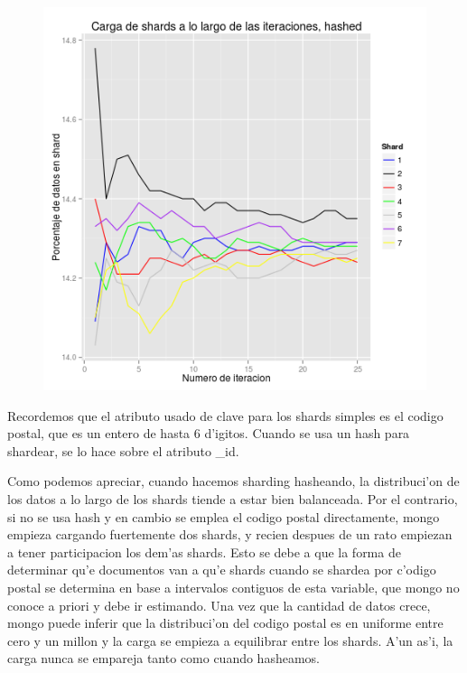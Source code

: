 \begin{figure}[H]
	\begin{center}
		\includegraphics[scale=0.6]{imagenes/siete_shards_hashed.png}
	\end{center}
\end{figure}

Recordemos que el atributo usado de clave para los shards simples es el codigo postal, que es un entero de hasta 6 d'igitos. Cuando se usa un hash para shardear, se lo hace sobre el atributo \_id.

Como podemos apreciar, cuando hacemos sharding hasheando, la distribuci'on de los datos a lo largo de los shards tiende a estar bien balanceada. Por el contrario, si no se usa hash y en cambio se emplea el codigo postal directamente, mongo empieza cargando fuertemente dos shards, y recien despues de un rato empiezan a tener participacion los dem'as shards. Esto se debe a que la forma de determinar qu'e documentos van a qu'e shards cuando se shardea por c'odigo postal se determina en base a intervalos contiguos de esta variable, que mongo no conoce a priori y debe ir estimando. Una vez que la cantidad de datos crece, mongo puede inferir que la distribuci'on del codigo postal es en uniforme entre cero y un millon y la carga se empieza a equilibrar entre los shards. A'un as'i, la carga nunca se empareja tanto como cuando hasheamos.

